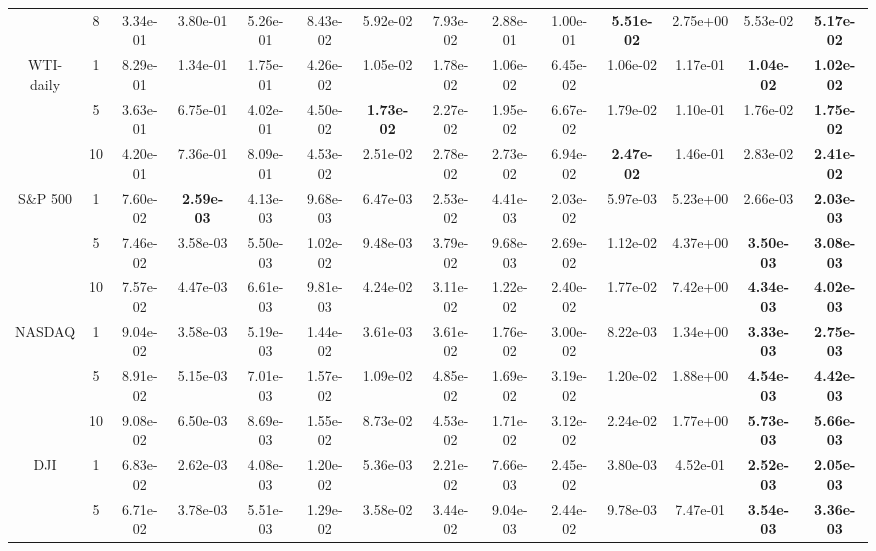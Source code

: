 \begin{table*}[!t]
{\begin{tabular}{cccccccccccccc}
 & 8& 3.34e-01& 3.80e-01 & 5.26e-01 & 8.43e-02 & 5.92e-02& 7.93e-02& 2.88e-01 & 1.00e-01 & \textbf{5.51e-02} & 2.75e+00 & 5.53e-02& \textbf{5.17e-02}\s \\ \cmidrule(l){2-14}
\multirowcell{3}{WTI-\\daily}& 1& 8.29e-01& 1.34e-01 & 1.75e-01 & 4.26e-02 & 1.05e-02& 1.78e-02& 1.06e-02 & 6.45e-02 & 1.06e-02& 1.17e-01 & \textbf{1.04e-02} & \textbf{1.02e-02}\s \\ \cmidrule(l){3-14}
 & 5& 3.63e-01& 6.75e-01 & 4.02e-01 & 4.50e-02 & \textbf{1.73e-02}\s & 2.27e-02& 1.95e-02 & 6.67e-02 & 1.79e-02& 1.10e-01 & 1.76e-02& \textbf{1.75e-02} \\ \cmidrule(l){3-14}
 & 10 & 4.20e-01& 7.36e-01 & 8.09e-01 & 4.53e-02 & 2.51e-02& 2.78e-02& 2.73e-02 & 6.94e-02 & \textbf{2.47e-02} & 1.46e-01 & 2.83e-02& \textbf{2.41e-02}\s \\ \cmidrule(l){2-14}
\multirow{3}{*}{S\&P 500}& 1& 7.60e-02& \textbf{2.59e-03}& 4.13e-03 & 9.68e-03 & 6.47e-03& 2.53e-02& 4.41e-03 & 2.03e-02 & 5.97e-03& 5.23e+00 & 2.66e-03& \textbf{2.03e-03}\s \\ \cmidrule(l){3-14}
 & 5& 7.46e-02& 3.58e-03 & 5.50e-03 & 1.02e-02 & 9.48e-03& 3.79e-02& 9.68e-03 & 2.69e-02 & 1.12e-02& 4.37e+00 & \textbf{3.50e-03} & \textbf{3.08e-03}\s \\ \cmidrule(l){3-14}
 & 10 & 7.57e-02& 4.47e-03 & 6.61e-03 & 9.81e-03 & 4.24e-02& 3.11e-02& 1.22e-02 & 2.40e-02 & 1.77e-02& 7.42e+00 & \textbf{4.34e-03} & \textbf{4.02e-03}\s \\ \cmidrule(l){2-14}
\multirow{3}{*}{NASDAQ}& 1& 9.04e-02& 3.58e-03 & 5.19e-03 & 1.44e-02 & 3.61e-03& 3.61e-02& 1.76e-02 & 3.00e-02 & 8.22e-03& 1.34e+00 & \textbf{3.33e-03} & \textbf{2.75e-03}\s \\ \cmidrule(l){3-14}
 & 5& 8.91e-02& 5.15e-03 & 7.01e-03 & 1.57e-02 & 1.09e-02& 4.85e-02& 1.69e-02 & 3.19e-02 & 1.20e-02& 1.88e+00 & \textbf{4.54e-03} & \textbf{4.42e-03}\s \\ \cmidrule(l){3-14}
 & 10 & 9.08e-02& 6.50e-03 & 8.69e-03 & 1.55e-02 & 8.73e-02& 4.53e-02& 1.71e-02 & 3.12e-02 & 2.24e-02& 1.77e+00 & \textbf{5.73e-03} & \textbf{5.66e-03}\s \\ \cmidrule(l){2-14}
\multirow{3}{*}{DJI} & 1& 6.83e-02& 2.62e-03 & 4.08e-03 & 1.20e-02 & 5.36e-03& 2.21e-02& 7.66e-03 & 2.45e-02 & 3.80e-03& 4.52e-01 & \textbf{2.52e-03} & \textbf{2.05e-03}\s \\ \cmidrule(l){3-14}
 & 5& 6.71e-02& 3.78e-03 & 5.51e-03 & 1.29e-02 & 3.58e-02& 3.44e-02& 9.04e-03 & 2.44e-02 & 9.78e-03& 7.47e-01 & \textbf{3.54e-03} & \textbf{3.36e-03}\s \\ \cmidrule(l){3-14}

\end{tabular}}
\end{table*}
